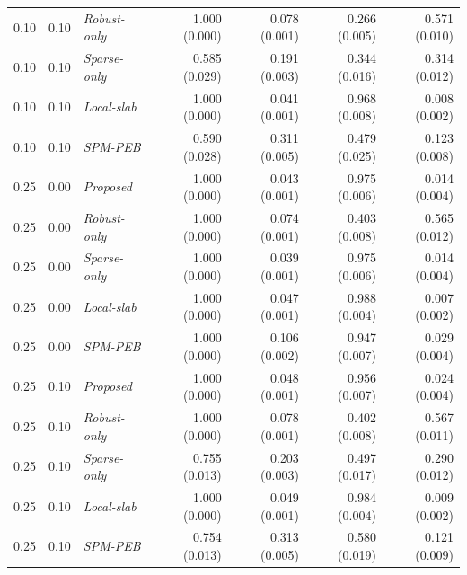 \begin{table}[htbp]
{\begin{tabular}{rrlrrrr}
0.10 & 0.10 & \emph{Robust-only} & 1.000 (0.000) & 0.078 (0.001) & 0.266 (0.005) & 0.571 (0.010)\\ 
0.10 & 0.10 & \emph{Sparse-only} & 0.585 (0.029) & 0.191 (0.003) & 0.344 (0.016) & 0.314 (0.012)\\ 
0.10 & 0.10 & \emph{Local-slab} & 1.000 (0.000) & 0.041 (0.001) & 0.968 (0.008) & 0.008 (0.002)\\ 
0.10 & 0.10 & \emph{SPM-PEB} & 0.590 (0.028) & 0.311 (0.005) & 0.479 (0.025) & 0.123 (0.008)\\ 
0.25 & 0.00 & \emph{Proposed} & 1.000 (0.000) & 0.043 (0.001) & 0.975 (0.006) & 0.014 (0.004)\\ 
0.25 & 0.00 & \emph{Robust-only} & 1.000 (0.000) & 0.074 (0.001) & 0.403 (0.008) & 0.565 (0.012)\\ 
0.25 & 0.00 & \emph{Sparse-only} & 1.000 (0.000) & 0.039 (0.001) & 0.975 (0.006) & 0.014 (0.004)\\ 
0.25 & 0.00 & \emph{Local-slab} & 1.000 (0.000) & 0.047 (0.001) & 0.988 (0.004) & 0.007 (0.002)\\ 
0.25 & 0.00 & \emph{SPM-PEB} & 1.000 (0.000) & 0.106 (0.002) & 0.947 (0.007) & 0.029 (0.004)\\ 
0.25 & 0.10 & \emph{Proposed} & 1.000 (0.000) & 0.048 (0.001) & 0.956 (0.007) & 0.024 (0.004)\\ 
0.25 & 0.10 & \emph{Robust-only} & 1.000 (0.000) & 0.078 (0.001) & 0.402 (0.008) & 0.567 (0.011)\\ 
0.25 & 0.10 & \emph{Sparse-only} & 0.755 (0.013) & 0.203 (0.003) & 0.497 (0.017) & 0.290 (0.012)\\ 
0.25 & 0.10 & \emph{Local-slab} & 1.000 (0.000) & 0.049 (0.001) & 0.984 (0.004) & 0.009 (0.002)\\ 
0.25 & 0.10 & \emph{SPM-PEB} & 0.754 (0.013) & 0.313 (0.005) & 0.580 (0.019) & 0.121 (0.009)\\ 
\bottomrule
\end{tabular}
}
\end{table}
 
